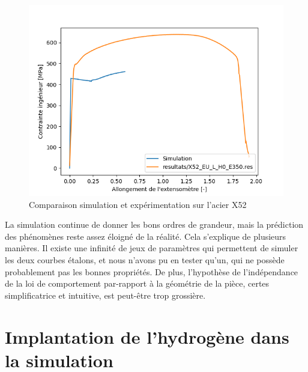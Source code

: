 \documentclass[a4paper, french, 11pt]{article}
\begin{document}
    \begin{figure}
        \includegraphics{image/INFLUENCE/X52_compa}
        \centering
        \caption{Comparaison simulation et expérimentation sur l'acier X52}
        \label{fig:X52_compar}
    \end{figure}
    
    La simulation continue de donner les bons ordres de grandeur, mais la prédiction des phénomènes reste assez éloigné de la réalité. Cela s'explique de plusieurs manières.
    Il existe une infinité de jeux de paramètres qui permettent de simuler les deux courbes étalons, et nous n'avons pu en tester qu'un, qui ne possède probablement pas les bonnes propriétés.
    De plus, l'hypothèse de l'indépendance de la loi de comportement par-rapport à la géométrie de la pièce, certes simplificatrice et intuitive, est peut-être trop grossière.


    \section{Implantation de l'hydrogène dans la simulation}
\end{document}
